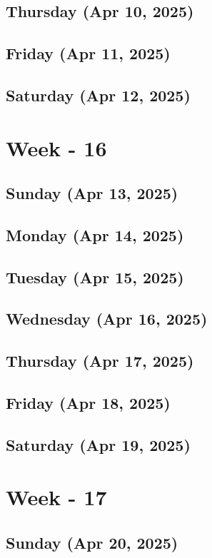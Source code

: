 \subsection*{Thursday (Apr 10, 2025)}
\subsection*{Friday (Apr 11, 2025)}
\subsection*{Saturday (Apr 12, 2025)}

\section{Week - 16}
\subsection*{Sunday (Apr 13, 2025)}
\subsection*{Monday (Apr 14, 2025)}
\subsection*{Tuesday (Apr 15, 2025)}
\subsection*{Wednesday (Apr 16, 2025)}
\subsection*{Thursday (Apr 17, 2025)}
\subsection*{Friday (Apr 18, 2025)}
\subsection*{Saturday (Apr 19, 2025)}

\section{Week - 17}
\subsection*{Sunday (Apr 20, 2025)}
